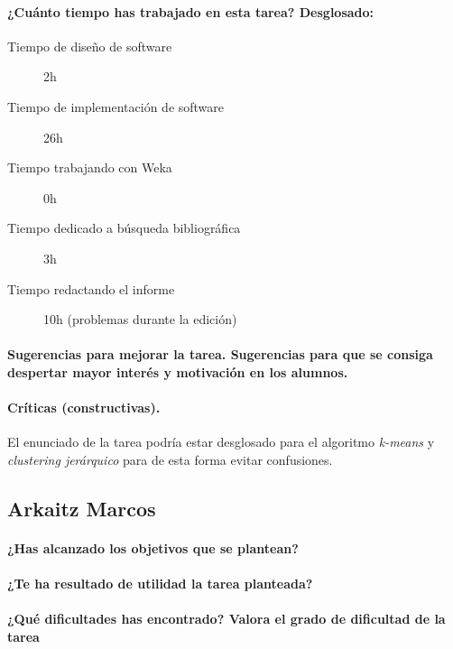 \documentclass[11pt, titlepage,a4paper]{article}
\begin{document}
\paragraph{¿Cuánto tiempo has trabajado en esta tarea? Desglosado:\\}
\begin{description}
	\item[Tiempo de diseño de software] 2h
	\item[Tiempo de implementación de software] 26h
	\item[Tiempo trabajando con Weka] 0h
	\item[Tiempo dedicado a búsqueda bibliográfica] 3h
	\item[Tiempo redactando el informe] 10h (problemas durante la edición)
\end{description}

\paragraph{Sugerencias para mejorar la tarea. Sugerencias para que se consiga despertar mayor
interés y motivación en los alumnos.\\}

\paragraph{ Críticas (constructivas).\\}
El enunciado de la tarea podría estar desglosado para el algoritmo
\textit{k-means} y \textit{clustering jerárquico} para de esta forma evitar confusiones.

\subsection{Arkaitz Marcos}
\paragraph{¿Has alcanzado los objetivos que se plantean?\\}

\paragraph{¿Te ha resultado de utilidad la tarea planteada?\\}

\paragraph{¿Qué dificultades has encontrado? Valora el grado de dificultad de
la tarea\\}
\end{document}
